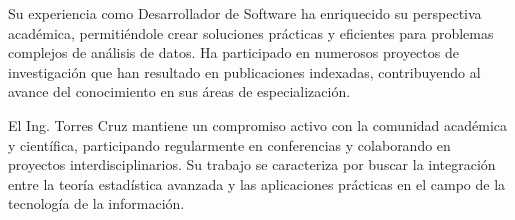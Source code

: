 \documentclass[12pt, a4paper, oneside]{book}
\begin{document}
	\medskip
	\noindent Su experiencia como Desarrollador de Software ha enriquecido su perspectiva académica, permitiéndole crear soluciones prácticas y eficientes para problemas complejos de análisis de datos. Ha participado en numerosos proyectos de investigación que han resultado en publicaciones indexadas, contribuyendo al avance del conocimiento en sus áreas de especialización.
	
	\medskip
	\noindent El Ing. Torres Cruz mantiene un compromiso activo con la comunidad académica y científica, participando regularmente en conferencias y colaborando en proyectos interdisciplinarios. Su trabajo se caracteriza por buscar la integración entre la teoría estadística avanzada y las aplicaciones prácticas en el campo de la tecnología de la información.
	
	\tableofcontents	
	
	
	
	
	
	
	
	
	
	
	
	
	
	
	
	
	
\end{document}
